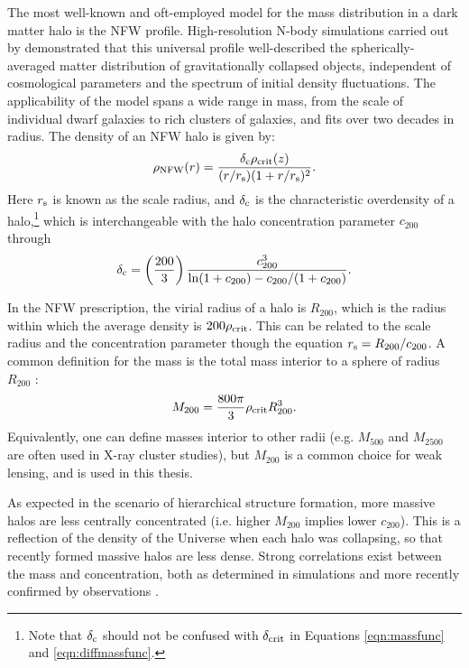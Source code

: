 The most well-known and oft-employed model for the mass distribution in a dark matter halo is the \ac{NFW} profile. High-resolution N-body simulations carried out by \citet{nfw96} demonstrated that this universal profile well-described the spherically-averaged matter distribution of gravitationally collapsed objects, independent of cosmological parameters and the spectrum of initial density fluctuations. The applicability of the model spans a wide range in mass, from the scale of individual dwarf galaxies to rich clusters of galaxies, and fits over two decades in radius. The density of an \ac{NFW} halo is given by:
\begin{equation}
\rho_{\mathrm{NFW}}(r) = \frac{\delta_{\rm c} \rho_{\mathrm{crit}}(z)}{(r/r_{\rm s})(1+r/r_{\rm s})^2}.
\end{equation}
Here $r_{\rm s}$ is known as the scale radius, and $\delta_{\rm c}$ is the characteristic overdensity of a halo,\footnote{Note that $\delta_{\rm c}$ should not be confused with $\delta_{\rm crit}$ in Equations \ref{eqn:massfunc} and \ref{eqn:diffmassfunc}.} which is interchangeable with the halo concentration parameter $c_{200}$ through
\begin{equation}
\delta_{\rm c} = \left( \frac{200}{3} \right) \frac{c_{200}^3}{{\rm ln}(1+c_{200}) - c_{200}/(1+c_{200})}.
\end{equation}

In the \ac{NFW} prescription, the virial radius of a halo is $R_{200}$, which is the radius within which the average density is $200\rho_{\rm crit}$. This can be related to the scale radius and the concentration parameter though the equation $r_{\rm s} = R_{200}/c_{200}$. A common definition for the mass is the total mass interior to a sphere of radius $R_{200}$ \citep{Wright00}:
\begin{equation}
M_{200} = \frac{800 \pi}{3} \rho_{\rm crit} R_{200}^3.
\end{equation}
Equivalently, one can define masses interior to other radii (e.g. $M_{500}$ and $M_{2500}$ are often used in X-ray cluster studies), but $M_{200}$ is a common choice for weak lensing, and is used in this thesis.

As expected in the scenario of hierarchical structure formation, more massive halos are less centrally concentrated (i.e. higher $M_{200}$ implies lower $c_{200}$). This is a reflection of the density of the Universe when each halo was collapsing, so that recently formed massive halos are less dense. Strong correlations exist between the mass and concentration, both as determined in simulations \citep{Duffy08,Prada12,Dutton14} and more recently confirmed by observations \citep{Okabe13,Merten14}. 

